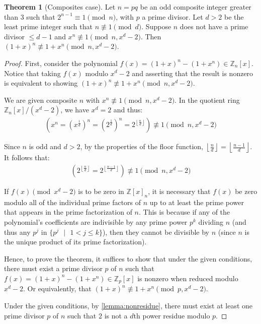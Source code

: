 \documentclass{article}
\theoremstyle{plain}
\theoremstyle{definition}
\newtheorem{theorem}{Theorem}
\begin{document}
\begin{theorem}[Composites case] \label{theorem:composites}
Let $n = pq$ be an odd composite integer greater than $3$ such that $2^{n-1} \equiv 1 \pmod{n}$, with $p$ a prime divisor. Let $d > 2$ be the least prime integer such that $n \not\equiv 1 \pmod{d}$. Suppose $n$ does not have a prime divisor $\leq d-1$ and $x^n \not\equiv 1 \pmod{n, x^d-2}$. Then $(1 + x)^n \not\equiv 1 + x^n \pmod{n, x^d-2}$.
\end{theorem}
\begin{proof}
First, consider the polynomial $f(x) = (1 + x)^n - (1 + x^n) \in \mathbb{Z}_n[x]$. Notice that taking $f(x)$ modulo $x^d - 2$ and asserting that the result is nonzero is equivalent to showing $(1 + x)^n \not\equiv 1 + x^n \pmod{n, x^d-2}$.

We are given composite $n$ with $x^n \not\equiv 1 \pmod{n, x^d-2}$. In the quotient ring $\mathbb{Z}_n[x]/(x^d-2)$, we have $x^d = 2$ and thus:
\begin{align}
    \left(x^n = (x^{\frac{1}{d}})^n = (2^{\frac{1}{d}})^n = 2^{\left\lfloor\frac{n}{d}\right\rfloor}\right) \not\equiv 1 \pmod{n,x^d-2}
\end{align}

Since $n$ is odd and $d > 2$, by the properties of the floor function, $\left\lfloor\frac{n}{d}\right\rfloor = \left\lfloor\frac{n-1}{d}\right\rfloor$. It follows that:
\begin{align}
    \left(2^{\left\lfloor\frac{n}{d}\right\rfloor} = 2^{\left\lfloor\frac{n-1}{d}\right\rfloor}\right) \not\equiv 1 \pmod{n,x^d-2}
\end{align}

If $f(x) \pmod{x^d-2}$ is to be zero in $\mathbb{Z}[x]_n$, it is necessary that $f(x)$ be zero modulo all of the individual prime factors of $n$ up to at least the prime power that appears in the prime factorization of $n$. This is because if any of the polynomial's coefficients are indivisible by any prime power $p^k$ dividing $n$ (and thus any $p^j$ in $\{ p^j \text{ } | \text{ } 1 < j \leq k \}$), then they cannot be divisible by $n$ (since $n$ is the unique product of its prime factorization).

Hence, to prove the theorem, it suffices to show that under the given conditions, there must exist a prime divisor $p$ of $n$ such that $f(x) = (1 + x)^n - (1 + x^n) \in \mathbb{Z}_p[x]$ is nonzero when reduced modulo $x^d - 2$. Or equivalently, that $(1 + x)^n \not\equiv 1 + x^n \pmod{p, x^d-2}$.

Under the given conditions, by \cref{lemma:nonresidue}, there must exist at least one prime divisor $p$ of $n$ such that $2$ is not a $d$th power residue modulo $p$.


\end{proof}
\end{document}
